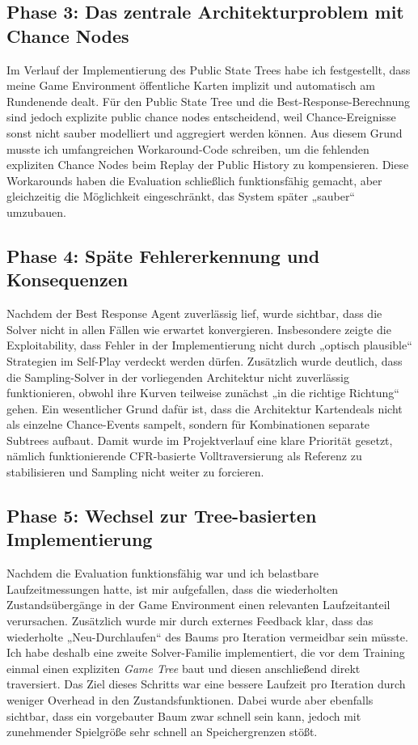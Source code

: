 \subsection{Phase 3: Das zentrale Architekturproblem mit Chance Nodes}
Im Verlauf der Implementierung des Public State Trees habe ich festgestellt, dass meine Game Environment öffentliche Karten implizit und automatisch am Rundenende dealt.
Für den Public State Tree und die Best-Response-Berechnung sind jedoch explizite public chance nodes entscheidend, weil Chance-Ereignisse sonst nicht sauber modelliert und aggregiert werden können.
Aus diesem Grund musste ich umfangreichen Workaround-Code schreiben, um die fehlenden expliziten Chance Nodes beim Replay der Public History zu kompensieren.
Diese Workarounds haben die Evaluation schließlich funktionsfähig gemacht, aber gleichzeitig die Möglichkeit eingeschränkt, das System später „sauber“ umzubauen.

\subsection{Phase 4: Späte Fehlererkennung und Konsequenzen}
Nachdem der Best Response Agent zuverlässig lief, wurde sichtbar, dass die Solver nicht in allen Fällen wie erwartet konvergieren.
Insbesondere zeigte die Exploitability, dass Fehler in der Implementierung nicht durch „optisch plausible“ Strategien im Self-Play verdeckt werden dürfen.
Zusätzlich wurde deutlich, dass die Sampling-Solver in der vorliegenden Architektur nicht zuverlässig funktionieren, obwohl ihre Kurven teilweise zunächst „in die richtige Richtung“ gehen.
Ein wesentlicher Grund dafür ist, dass die Architektur Kartendeals nicht als einzelne Chance-Events sampelt, sondern für Kombinationen separate Subtrees aufbaut.
Damit wurde im Projektverlauf eine klare Priorität gesetzt, nämlich funktionierende CFR-basierte Volltraversierung als Referenz zu stabilisieren und Sampling nicht weiter zu forcieren.

\subsection{Phase 5: Wechsel zur Tree-basierten Implementierung}
Nachdem die Evaluation funktionsfähig war und ich belastbare Laufzeitmessungen hatte, ist mir aufgefallen, dass die wiederholten Zustandsübergänge in der Game Environment einen relevanten Laufzeitanteil verursachen.
Zusätzlich wurde mir durch externes Feedback klar, dass das wiederholte „Neu-Durchlaufen“ des Baums pro Iteration vermeidbar sein müsste.
Ich habe deshalb eine zweite Solver-Familie implementiert, die vor dem Training einmal einen expliziten \emph{Game Tree} baut und diesen anschließend direkt traversiert.
Das Ziel dieses Schritts war eine bessere Laufzeit pro Iteration durch weniger Overhead in den Zustandsfunktionen.
Dabei wurde aber ebenfalls sichtbar, dass ein vorgebauter Baum zwar schnell sein kann, jedoch mit zunehmender Spielgröße sehr schnell an Speichergrenzen stößt.

